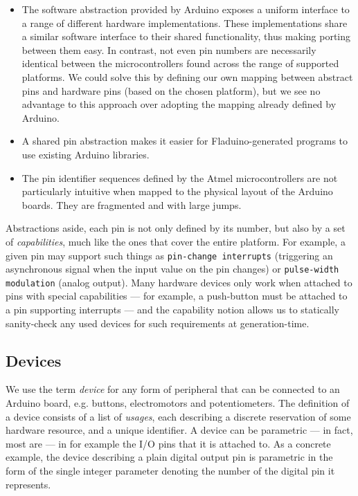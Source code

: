 \documentclass[a4paper, oneside, final]{memoir}
\begin{document}
\begin{itemize}
\item The software abstraction provided by Arduino exposes a uniform
  interface to a range of different hardware implementations.  These
  implementations share a similar software interface to their shared
  functionality, thus making porting between them easy.  In contrast,
  not even pin numbers are necessarily identical between the
  microcontrollers found across the range of supported platforms.  We
  could solve this by defining our own mapping between abstract pins
  and hardware pins (based on the chosen platform), but we see no
  advantage to this approach over adopting the mapping already defined
  by Arduino.
\item A shared pin abstraction makes it easier for Fladuino-generated
  programs to use existing Arduino libraries.
\item The pin identifier sequences defined by the Atmel
  microcontrollers are not particularly intuitive when mapped to the
  physical layout of the Arduino boards.  They are fragmented and with
  large jumps.
\end{itemize}

Abstractions aside, each pin is not only defined by its number, but
also by a set of \textit{capabilities}, much like the ones that cover
the entire platform.  For example, a given pin may support such things
as \texttt{pin-change interrupts} (triggering an asynchronous signal
when the input value on the pin changes) or \texttt{pulse-width
  modulation} (analog output).  Many hardware devices only work when
attached to pins with special capabilities --- for example, a
push-button must be attached to a pin supporting interrupts --- and
the capability notion allows us to statically sanity-check any used
devices for such requirements at generation-time.

\subsection{Devices}
\label{sec:devices}
We use the term \textit{device} for any form of peripheral that can be
connected to an Arduino board, e.g. buttons, electromotors and
potentiometers.  The definition of a device consists of a list of
\textit{usages}, each describing a discrete reservation of some
hardware resource, and a unique identifier.  A device can be
parametric --- in fact, most are --- in for example the I/O pins that
it is attached to.  As a concrete example, the device describing a
plain digital output pin is parametric in the form of the single
integer parameter denoting the number of the digital pin it
represents.
\end{document}

